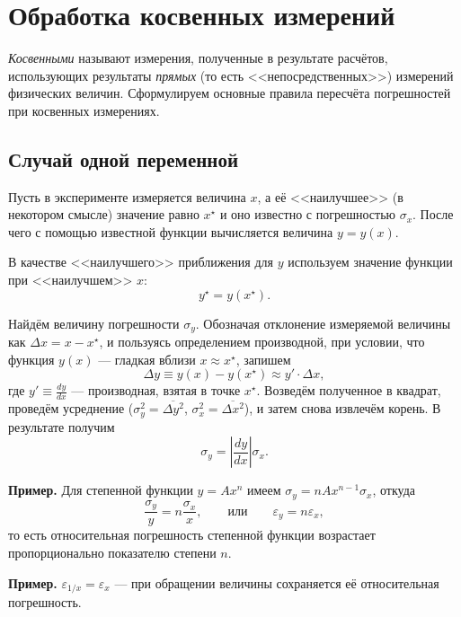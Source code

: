 \documentclass[10pt]{article}
\begin{document}
\section{Обработка косвенных измерений\label{sec:kosv}}

\emph{Косвенными} называют измерения, полученные в результате расчётов,
использующих результаты \emph{прямых} (то есть <<непосредственных>>)
измерений физических величин. Сформулируем основные правила пересчёта
погрешностей при косвенных измерениях.

\subsection{Случай одной переменной}

Пусть в эксперименте измеряется величина $x$, а её <<наилучшее>>
(в некотором смысле) значение равно $x^{\star}$ и оно известно с
погрешностью $\sigma_{x}$. После чего с помощью известной функции
вычисляется величина $y=y\!\left(x\right)$.

В качестве <<наилучшего>> приближения для
$y$ используем значение функции при <<наилучшем>>
$x$:
\[
y^{\star}=y\!\left(x^{\star}\right).
\]

Найдём величину погрешности $\sigma_{y}$. Обозначая отклонение измеряемой
величины как $\Delta x=x-x^{\star}$, и пользуясь определением производной,
при условии, что функция $y\left(x\right)$ --- гладкая
вблизи $x\approx x^{\star}$, запишем 
\[
\Delta y\equiv y\left(x\right)-y\left(x^{\star}\right)\approx y'\cdot\Delta x,
\]
где $y'\equiv\frac{dy}{dx}$ --- производная, взятая в точке
$x^{\star}$. Возведём полученное в квадрат, проведём усреднение ($\sigma_{y}^{2}=\overline{\Delta y^{2}}$,
$\sigma_{x}^{2}=\overline{\Delta x^{2}}$), и затем снова извлечём
корень. В результате получим
\begin{equation}
\boxed{{\sigma_{y}=\left|\frac{dy}{dx}\right|\sigma_{x}.}}\label{eq:sxy}
\end{equation}

{\footnotesize
\textbf{Пример.} Для степенной функции
$y=Ax^{n}$ имеем $\sigma_{y}=nAx^{n-1}\sigma_{x}$, откуда 
\[
\frac{\sigma_{y}}{y}=n\frac{\sigma_{x}}{x},\qquad\text{или}\qquad\varepsilon_{y}=n\varepsilon_{x},
\]
то есть относительная погрешность степенной функции возрастает пропорционально
показателю степени $n$.\par
}%

{\footnotesize
\textbf{Пример.} $\varepsilon_{1/x}=\varepsilon_{x}$
--- при обращении величины сохраняется её относительная
погрешность.\par
}%
\end{document}
